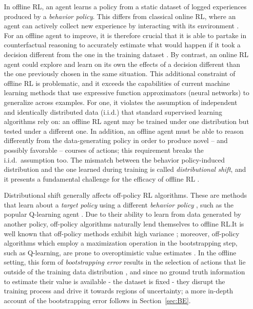 In offline RL, an agent learns a policy from a static dataset of
logged experiences produced by a \textit{behavior policy}.
This differs from classical online RL, where an agent can actively
collect new experience by interacting with its environment
\citep{sutton2018reinforcement}. For an offline agent to
improve, it is therefore crucial that it is able to partake in
counterfactual
reasoning to accurately estimate what would happen if it took a
decision different from the one in the training dataset
\citep{levine2020offline}. By contrast, an online RL agent could
explore and learn on its own the effects of a decision
different than the one previously chosen in the same situation. This
additional constraint of offline RL is
problematic, and it exceeds the capabilities of current machine learning
methods that use expressive function approximators (neural networks)
to generalize across examples. For one, it violates the assumption of
independent and
identically distributed data (i.i.d.) that standard supervised
learning algorithms rely on: an offline RL agent may be trained under
one distribution but tested under a different one.
In addition, an offline agent must be able to reason differently from
the data-generating policy in order to produce novel -- and possibly
favorable -- courses of actions; this requirement breaks the i.i.d.\
assumption too.
The mismatch between the behavior policy-induced distribution and the
one learned during training is called \textit{distributional shift},
and it presents a fundamental challenge for the efficacy of offline RL
\citep{levine2020offline}.

Distributional shift generally affects off-policy RL algorithms. These
are methods that learn about a \textit{target policy} using a
different \textit{behavior policy} \citep{sutton2018reinforcement},
such as the popular Q-learning agent \citep{watkins1992q}. Due to
their ability to learn from data generated by another policy,
off-policy algorithms naturally lend themselves to offline RL.\@ It is
well known that off-policy methods exhibit high variance
\citep{sutton2018reinforcement}; moreover,
off-policy algorithms which employ a maximization operation in the
bootstrapping step, such as Q-learning,
are prone to overoptimistic value estimates
\citep{thrun1993issues}. In the offline setting, this form of
\textit{bootstrapping error} results in the selection of actions that
lie outside of the training data distribution
\citep{kumar2019stabilizing}, and since no ground truth information to
estimate their value is available - the dataset is fixed - they
disrupt the training process and drive it towards regions of
uncertainty; a more in-depth account of the bootstrapping error
follows in Section~\ref{sec:BE}.

